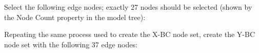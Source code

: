 \documentclass[
    11pt,        %
    a4paper,     %
    final,       %
    fleqn,       %
    notitlepage, %
    onecolumn,   %
    oneside,     %
]{article}
\begin{document}
Select the following edge nodes; exactly 27 nodes should be selected (shown by the Node Count property in the model tree):
\begin{center}
\end{center}

Repeating the same process used to create the X-BC node set, create the Y-BC node set with the following 37 edge nodes:
\begin{center}
\end{center}
\end{document}
